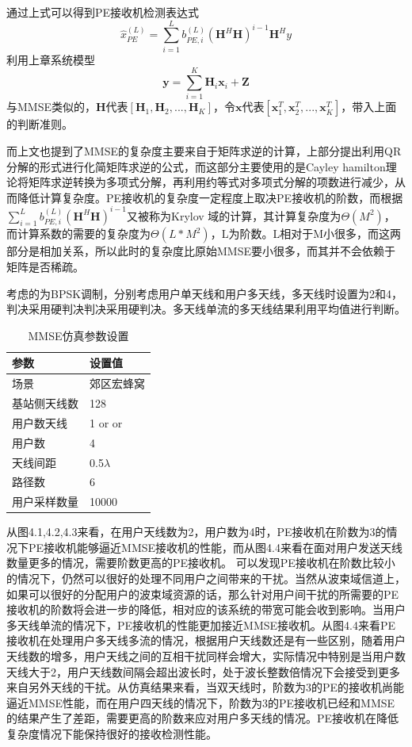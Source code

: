 \documentclass[bachelor,nocolorlinks, printoneside]{seuthesis} %
\begin{document}
\begin{Main}
通过上式可以得到PE接收机检测表达式
\begin{equation}\label{key}
\hat{x}_{PE}^{(L)} = \sum_{i=1}^{L}b_{PE,i}^{(L)}(\mathbf{H}^H\mathbf{H})^{i-1}  \mathbf{H}^H y
\end{equation}
利用上章系统模型
\begin{equation}\label{key}
	\mathbf{y} = \sum_{i=1}^{K} \mathbf{H}_i \mathbf{x}_i + \mathbf{Z}
\end{equation}
与MMSE类似的，$\mathbf{H}$代表$[\mathbf{H}_1,\mathbf{H}_2,...,\mathbf{H}_K]$，令$\mathbf{x}$代表$[\mathbf{x}_1^T,\mathbf{x}_2^T,...,\mathbf{x}_K^T]$，带入上面的判断准则。

而上文也提到了MMSE的复杂度主要来自于矩阵求逆的计算，上部分提出利用QR分解的形式进行化简矩阵求逆的公式，而这部分主要使用的是Cayley hamilton理论将矩阵求逆转换为多项式分解，再利用约等式对多项式分解的项数进行减少，从而降低计算复杂度。PE接收机的复杂度一定程度上取决PE接收机的阶数，而根据$\sum_{i=1}^{L} b_{PE,i}^{(L)}(\mathbf{H}^H\mathbf{H})^{i-1}$又被称为Krylov 域的计算，其计算复杂度为$\Theta(M^2)$，而计算系数的需要的复杂度为$\Theta(L*M^2)$，L为阶数。L相对于M小很多，而这两部分是相加关系，所以此时的复杂度比原始MMSE要小很多，而其并不会依赖于矩阵是否稀疏。

考虑的为BPSK调制，分别考虑用户单天线和用户多天线，多天线时设置为2和4，判决采用硬判决判决采用硬判决。多天线单流的多天线结果利用平均值进行判断。
\begin{table}[htbp]
	\centering
	\caption{\label{tab:test}MMSE仿真参数设置}
	\begin{tabular}{ll}
		\toprule
		参数 &  设置值 \\
		\bottomrule
		场景 &  郊区宏蜂窝 \\
		\bottomrule
		基站侧天线数 & 128 \\
		\bottomrule
		用户数天线	& 1 \quad or\quad2 or\quad4\\
		\bottomrule
		用户数	& 4 \\
		\bottomrule
		天线间距 & 0.5$\lambda$ \\
		\bottomrule
		路径数 & 6 \\
		\bottomrule
		用户采样数量 & 10000 \\
		\bottomrule
	\end{tabular}
\end{table}


从图4.1,4.2,4.3来看，在用户天线数为2，用户数为4时，PE接收机在阶数为3的情况下PE接收机能够逼近MMSE接收机的性能，而从图4.4来看在面对用户发送天线数量更多的情况，需要阶数更高的PE接收机。
可以发现PE接收机在阶数比较小的情况下，仍然可以很好的处理不同用户之间带来的干扰。当然从波束域信道上，如果可以很好的分配用户的波束域资源的话，那么针对用户间干扰的所需要的PE接收机的阶数将会进一步的降低，相对应的该系统的带宽可能会收到影响。当用户多天线单流的情况下，PE接收机的性能更加接近MMSE接收机。从图4.4来看PE接收机在处理用户多天线多流的情况，根据用户天线数还是有一些区别，随着用户天线数的增多，用户天线之间的互相干扰同样会增大，实际情况中特别是当用户数天线大于2，用户天线数间隔会超出波长时，处于波长整数倍情况下会接受到更多来自另外天线的干扰。从仿真结果来看，当双天线时，阶数为3的PE的接收机尚能逼近MMSE性能，而在用户四天线的情况下，阶数为3的PE接收机已经和MMSE的结果产生了差距，需要更高的阶数来应对用户多天线的情况。PE接收机在降低复杂度情况下能保持很好的接收检测性能。


\end{Main}
\end{document}
